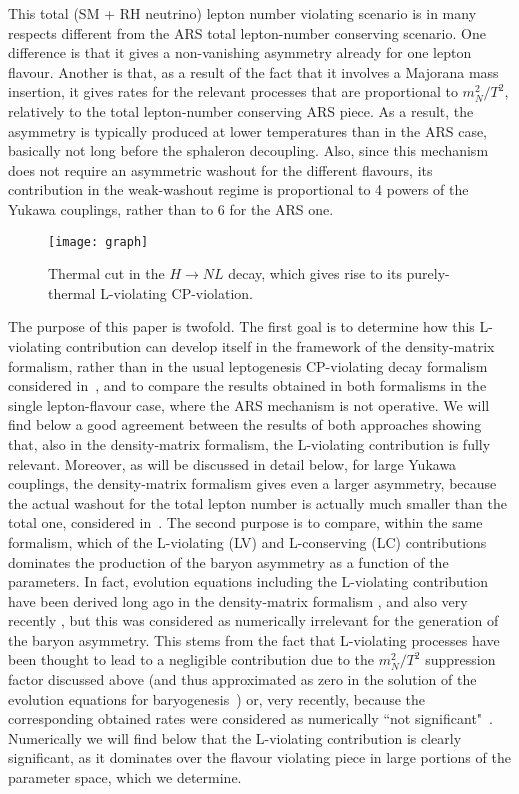 \documentclass[prd,twocolumn,superscriptaddress,preprintnumbers,nofootinbib,
noshowpacs,groupedaddress]{revtex4-1} %
\begin{document}
This total (SM + RH neutrino) lepton number violating scenario is in many respects different from the ARS total lepton-number conserving scenario. One difference is that it gives a non-vanishing asymmetry already for one lepton flavour.  Another is that, as a result of the fact that it involves a Majorana mass insertion, it gives rates for the relevant processes that are proportional to $m_N^2/T^2$, relatively to the total lepton-number conserving ARS piece. As a result, the asymmetry is typically produced at lower temperatures than in the ARS case, basically not long before the sphaleron decoupling. Also, since this mechanism does not require an asymmetric washout for the different flavours, its contribution in the weak-washout regime is proportional to 4 powers of the Yukawa couplings, rather than to 6 for the ARS one. 

\begin{figure}[b!]
\texttt{[image: graph]}
\caption{Thermal cut in the $H \to NL$ decay, which gives rise to its purely-thermal L-violating CP-violation.\label{fig:graph}}
\end{figure}

The purpose of this paper is twofold. The first goal is to determine how this L-violating contribution can develop itself in the framework of the density-matrix formalism, rather than in the usual leptogenesis CP-violating decay formalism considered in~\cite{Hambye:2016sby}, and to compare the results obtained in both formalisms in the single lepton-flavour case, where the ARS mechanism is not operative. We will find below a good agreement between the results of both approaches showing that, also in the density-matrix formalism, the L-violating contribution is fully relevant. Moreover, as will be discussed in detail below, for large Yukawa couplings, the density-matrix formalism gives even a larger asymmetry, because the actual washout for the total lepton number is actually much smaller than the total one, considered in~\cite{Hambye:2016sby}. The second purpose is to compare, within the same formalism, which of the L-violating (LV) and L-conserving (LC) contributions dominates the production of the baryon asymmetry as a function of the parameters. In fact, evolution equations including the L-violating contribution have been derived  long ago in the density-matrix formalism \cite{Shaposhnikov:2008pf,Canetti:2012kh}, and also very recently \cite{Ghiglieri:2017gjz,Eijima:2017anv}, but this was considered as numerically irrelevant for the generation of the baryon asymmetry. This stems from the fact that L-violating processes have been thought to lead to a negligible contribution due to the $m_N^2/T^2$ suppression factor discussed above (and thus approximated as zero in the solution of the evolution equations for baryogenesis~\cite{Canetti:2012kh}) or, very recently, because the corresponding obtained rates were considered as numerically ``not significant"~\cite{Ghiglieri:2017gjz}. 
Numerically we will find below that the L-violating contribution is clearly significant, as it dominates over the flavour violating piece in large portions of the parameter space, which we determine. 
\end{document}
